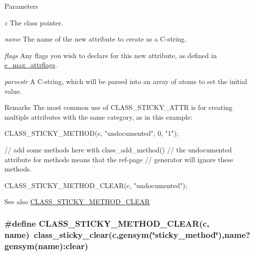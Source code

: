 \begin{DoxyParams}{Parameters}
\item[{\em c}]The class pointer. \item[{\em name}]The name of the new attribute to create as a C-\/string. \item[{\em flags}]Any flags you wish to declare for this new attribute, as defined in \hyperlink{group__attr_gaf296cfc6741bb19207f6ed8062809115}{e\_\-max\_\-attrflags}. \item[{\em parsestr}]A C-\/string, which will be parsed into an array of atoms to set the initial value.\end{DoxyParams}
\begin{DoxyRemark}{Remarks}
The most common use of CLASS\_\-STICKY\_\-ATTR is for creating multiple attributes with the same category, as in this example: 
\begin{DoxyCode}
    CLASS_STICKY_METHOD(c, "undocumented", 0, "1");
    
    // add some methods here with class_add_method()
    // the undocumented attribute for methods means that the ref-page 
    // generator will ignore these methods.
    
    CLASS_STICKY_METHOD_CLEAR(c, "undocumented");
\end{DoxyCode}

\end{DoxyRemark}
\begin{DoxySeeAlso}{See also}
\hyperlink{group__attr_gaa7a445747716396d70d8fa6fb65861dc}{CLASS\_\-STICKY\_\-METHOD\_\-CLEAR} 
\end{DoxySeeAlso}
\hypertarget{group__attr_gaa7a445747716396d70d8fa6fb65861dc}{
\subsubsection[{CLASS\_\-STICKY\_\-METHOD\_\-CLEAR}]{\setlength{\rightskip}{0pt plus 5cm}\#define CLASS\_\-STICKY\_\-METHOD\_\-CLEAR(c, \/  name)~class\_\-sticky\_\-clear(c,gensym(\char`\"{}sticky\_\-method\char`\"{}),name?gensym(name):clear)}}
\label{group__attr_gaa7a445747716396d70d8fa6fb65861dc}


